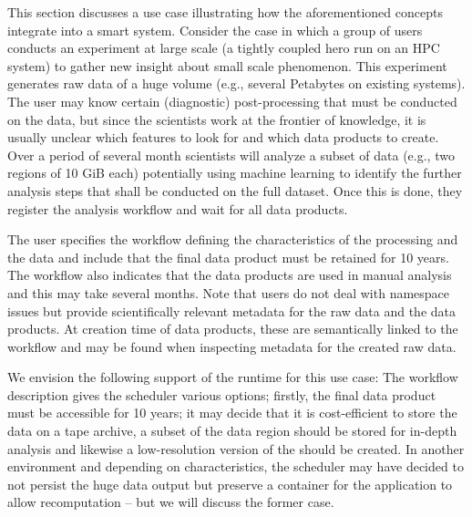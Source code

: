 \documentclass[a4paper, twocolumn]{article}
\begin{document}
This section discusses a use case illustrating how the aforementioned concepts integrate into a smart system.
Consider the case in which a group of users conducts an experiment at large scale (a tightly coupled hero run on an HPC system) to gather new insight about small scale phenomenon.
This experiment generates raw data of a huge volume (e.g., several Petabytes on existing systems).
The user may know certain (diagnostic) post-processing that must be conducted on the data, but since the scientists work at the frontier of knowledge, it is usually unclear which features to look for and which data products to create.
Over a period of several month scientists will analyze a subset of data (e.g., two regions of 10 GiB each) potentially using machine learning to identify the further analysis steps that shall be conducted on the full dataset.
Once this is done, they register the analysis workflow and wait for all data products.

The user specifies the workflow defining the characteristics of the processing and the data and include that the final data product must be retained for 10 years.
The workflow also indicates that the data products are used in manual analysis and this may take several months.
Note that users do not deal with namespace issues but provide scientifically relevant metadata for the raw data and the data products.
At creation time of data products, these are semantically linked to the workflow and may be found when inspecting metadata for the created raw data.

\medskip

We envision the following support of the runtime for this use case:
The workflow description gives the scheduler various options; firstly, the final data product must be accessible for 10 years; it may decide that it is cost-efficient to store the data on a tape archive, a subset of the data region should be stored for in-depth analysis and likewise a low-resolution version of the should be created.
In another environment and depending on characteristics, the scheduler may have decided to not persist the huge data output but preserve a container for the application to allow recomputation -- but we will discuss the former case.
\end{document}
